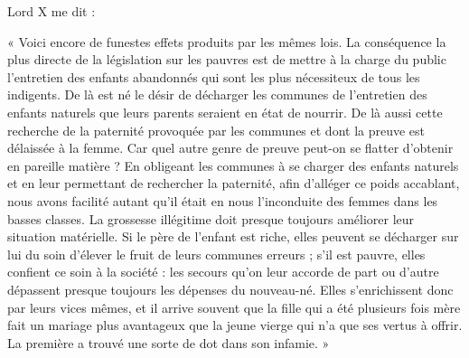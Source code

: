 \documentclass[french,twoside]{book} %
\newenvironment{quoteblock}%
  {\begin{quoting}}
  {\end{quoting}}
\newenvironment{quotebar}{%
    \def\FrameCommand{{\color{rubric!10!}\vrule width 0.5em} \hspace{0.9em}}%
    \def\OuterFrameSep{\itemsep} %
    \MakeFramed {\advance\hsize-\width \FrameRestore}
  }%
  {%
    \endMakeFramed
  }
\renewenvironment{quoteblock}%
  {%
    \savenotes
    \setstretch{0.9}
    \begin{quotebar}
  }
  {%
    \end{quotebar}
    \spewnotes
  }
\begin{document}
\noindent Lord X me dit :\par

\begin{quoteblock}
 \noindent « Voici encore de funestes effets produits par les mêmes lois. La conséquence la plus directe de la législation sur les pauvres est de mettre à la charge du public l’entretien des enfants abandonnés qui sont les plus nécessiteux de tous les indigents. De là est né le désir de décharger les communes de l’entretien des enfants naturels que leurs parents seraient en état de nourrir. De là aussi cette recherche de la paternité provoquée par les communes et dont la preuve est délaissée à la femme. Car quel autre genre de preuve peut-on se flatter d’obtenir en pareille matière ? En obligeant les communes à se charger des enfants naturels et en leur permettant de rechercher la paternité, afin d’alléger ce poids accablant, nous avons facilité autant qu’il était en nous l’inconduite des femmes dans les basses classes. La grossesse illégitime doit presque toujours améliorer leur situation matérielle. Si le père de l’enfant est riche, elles peuvent se décharger sur lui du soin d’élever le fruit de leurs communes erreurs ; s’il est pauvre, elles confient ce soin à la société : les secours qu’on leur accorde de part ou d’autre dépassent presque toujours les dépenses du nouveau-né. Elles s’enrichissent donc par leurs vices mêmes, et il arrive souvent que la fille qui a été plusieurs fois mère fait un mariage plus avantageux que la jeune vierge qui n’a que ses vertus à offrir. La première a trouvé une sorte de dot dans son infamie. »
 \end{quoteblock}
\end{document}
